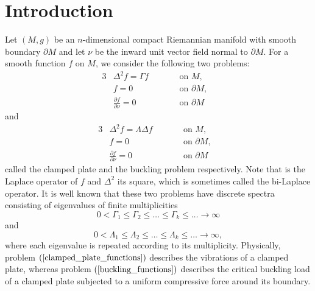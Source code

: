 \documentclass[pdftex]{sigma}
\numberwithin{equation}{section}
\theoremstyle{definition}
\begin{document}


\section{Introduction}
Let $(M,g)$ be an $n$-dimensional compact Riemannian manifold with smooth boundary $\partial M$ and let $\nu$ be the inward unit vector field normal to $\partial M$.
For a smooth function $f$ on $M$, we consider the following two problems:
\begin{alignat}{3}
&\Delta^2 f = \Gamma f\qquad && \textrm{on } M,&\nonumber\\
&f = 0 \quad && \textrm{on } \partial M,&\label{clamped_plate_functions}\\
&\frac{\partial f}{\partial\nu} = 0 \quad&& \textrm{on } \partial M&\nonumber
\end{alignat}
and
\begin{alignat}{3}
&\Delta^2 f=\Lambda \Delta f \qquad && \textrm{on } M,&\nonumber\\
&f = 0 \quad && \textrm{on } \partial M,&\label{buckling_functions}\\
&\frac{\partial f}{\partial\nu} = 0 \quad && \textrm{on } \partial M&\nonumber
\end{alignat}
called the clamped plate and the buckling problem respectively.
Note that  is the Laplace operator of $f$ and $\Delta^2 $ its square, which is sometimes called the bi-Laplace operator.
It is well known that these two problems have discrete spectra consisting of eigenvalues of finite multiplicities
\[ 0< \Gamma_1\le \Gamma_2 \le \dots \le \Gamma_k \le \dots \longrightarrow \infty\]
and
\[ 0< \Lambda_1 \le \Lambda_2 \le \dots \le \Lambda_k \le \dots \longrightarrow \infty,\]
where each eigenvalue is repeated according to its multiplicity.
Physically, problem $(\ref{clamped_plate_functions})$ describes the vibrations of a clamped plate, whereas problem $(\ref{buckling_functions})$ describes the critical buckling load of a clamped plate subjected to a uniform compressive force around its boundary.
\end{document}
